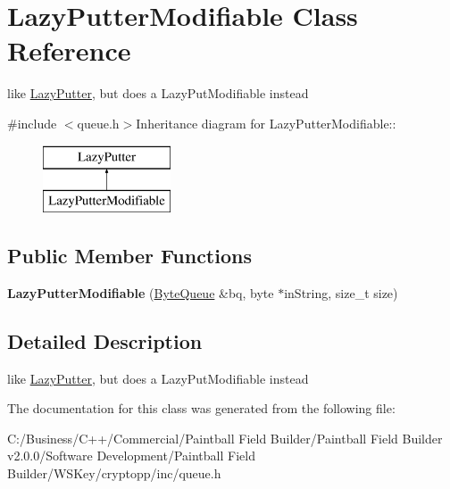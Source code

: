 \hypertarget{class_lazy_putter_modifiable}{
\section{LazyPutterModifiable Class Reference}
\label{class_lazy_putter_modifiable}
}


like \hyperlink{class_lazy_putter}{LazyPutter}, but does a LazyPutModifiable instead  


{\ttfamily \#include $<$queue.h$>$}Inheritance diagram for LazyPutterModifiable::\begin{figure}[H]
\begin{center}
\leavevmode
\includegraphics[height=2cm]{class_lazy_putter_modifiable}
\end{center}
\end{figure}
\subsection*{Public Member Functions}
\begin{DoxyCompactItemize}
\item 
\hypertarget{class_lazy_putter_modifiable_a46cbd28000808c11e13f4e326b2cbd89}{
{\bfseries LazyPutterModifiable} (\hyperlink{class_byte_queue}{ByteQueue} \&bq, byte $\ast$inString, size\_\-t size)}
\label{class_lazy_putter_modifiable_a46cbd28000808c11e13f4e326b2cbd89}

\end{DoxyCompactItemize}


\subsection{Detailed Description}
like \hyperlink{class_lazy_putter}{LazyPutter}, but does a LazyPutModifiable instead 

The documentation for this class was generated from the following file:\begin{DoxyCompactItemize}
\item 
C:/Business/C++/Commercial/Paintball Field Builder/Paintball Field Builder v2.0.0/Software Development/Paintball Field Builder/WSKey/cryptopp/inc/queue.h\end{DoxyCompactItemize}
